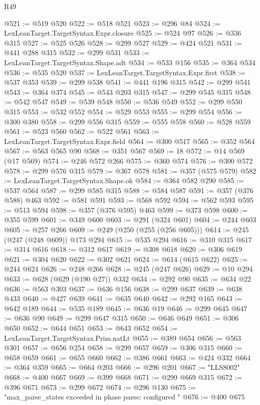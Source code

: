 \begin{lexlean}{R49}
\begin{coremodule}
@521 := @519 @520
@522 := @518 @521
@523 := @296 @84
@524 := LexLeanTarget.TargetSyntax.Expr.closure
@525 := @524 @97
@526 := @336 @315
@527 := @525 @526
@528 := @299 @527
@529 := @424 @521
@531 := @441 @288 @315
@532 := @299 @531
@533 := LexLeanTarget.TargetSyntax.Shape.adt
@534 := @533 @156
@535 := @364 @534
@536 := @535 @520
@537 := LexLeanTarget.TargetSyntax.Expr.first
@538 := @537 @353
@539 := @299 @538
@541 := @441 @196 @315
@542 := @299 @541
@543 := @364 @374
@545 := @543 @203 @315
@547 := @299 @545 @315
@548 := @542 @547
@549 := @539 @548
@550 := @536 @549
@552 := @299 @550 @315
@553 := @532 @552
@554 := @529 @553
@555 := @299 @554
@556 := @300 @380
@558 := @299 @556 @315
@559 := @555 @558
@560 := @528 @559
@561 := @523 @560
@562 := @522 @561
@563 := LexLeanTarget.TargetSyntax.Expr.field
@564 := @300 @517
@565 := @352 @564
@567 := @563 @565 @90
@568 := @351 @567
@569 := 18
@572 := @14 @569 (@17 @569)
@574 := @246 @572 @266
@575 := @360 @574
@576 := @300 @572
@578 := @299 @576 @315
@579 := @367 @578
@581 := @357 (@575 @579)
@582 := LexLeanTarget.TargetSyntax.Shape.ok
@584 := @364 @582 @290
@585 := @537 @564
@587 := @299 @585 @315
@588 := @584 @587
@591 := @357 (@376 @588) @463
@592 := @581 @591
@593 := @568 @592
@594 := @562 @593
@595 := @513 @594
@598 := @357 (@376 @595) @463
@599 := @373 @598
@600 := @355 @599
@601 := @349 @600
@603 := @291 (@324 @601)
@604 := @244 @603
@605 := @257 @266
@609 := @249 (@250 (@255 (@256 @605)))
@614 := @245 (@247 (@248 @609)) @173 @294
@615 := @535 @294
@616 := @310 @315
@617 := @314 @616
@618 := @312 @617
@619 := @308 @618
@620 := @306 @619
@621 := @304 @620
@622 := @302 @621
@624 := @614 (@615 @622)
@625 := @244 @624
@626 := @248 @266
@628 := @245 (@247 @626)
@629 := @10 @294
@633 := @628 (@629 (@190 @27)) @332
@634 := @292 @90
@635 := @634 @22
@636 := @563 @303
@637 := @636 @156
@638 := @299 @637
@639 := @638 @433
@640 := @427 @639
@641 := @635 @640
@642 := @292 @165
@643 := @642 @189
@644 := @535 @189
@645 := @636 @19
@646 := @299 @645
@647 := @636 @90
@649 := @299 @647 @315
@650 := @646 @649
@651 := @306 @650
@652 := @644 @651
@653 := @643 @652
@654 := LexLeanTarget.TargetSyntax.Prim.natLt
@655 := @389 @654
@656 := @563 @301
@657 := @656 @254
@658 := @299 @657
@659 := @306 @315
@660 := @658 @659
@661 := @655 @660
@662 := @386 @661
@663 := @424 @332
@664 := @364 @359
@665 := @664 @203
@666 := @296 @201
@667 := "LLS8002"
@668 := @400 @667
@669 := @399 @668
@671 := @299 @669 @315
@672 := @396 @671
@673 := @299 @672
@674 := @296 @130
@675 := "max_parse_states exceeded in phase parse: configured "
@676 := @400 @675

\end{coremodule}
\end{lexlean}

